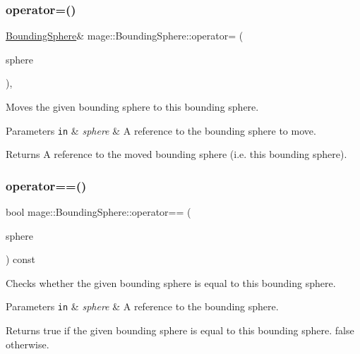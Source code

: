 \subsubsection{\texorpdfstring{operator=()}{operator=()}\hspace{0.1cm}{\footnotesize\ttfamily [2/2]}}
{\footnotesize\ttfamily \hyperlink{classmage_1_1_bounding_sphere}{Bounding\+Sphere}\& mage\+::\+Bounding\+Sphere\+::operator= (\begin{DoxyParamCaption}\item[{\hyperlink{classmage_1_1_bounding_sphere}{Bounding\+Sphere} \&\&}]{sphere }\end{DoxyParamCaption})\hspace{0.3cm}{\ttfamily [default]}, {\ttfamily [noexcept]}}

Moves the given bounding sphere to this bounding sphere.


\begin{DoxyParams}[1]{Parameters}
\mbox{\tt in}  & {\em sphere} & A reference to the bounding sphere to move. \\
\hline
\end{DoxyParams}
\begin{DoxyReturn}{Returns}
A reference to the moved bounding sphere (i.\+e. this bounding sphere). 
\end{DoxyReturn}
\hypertarget{classmage_1_1_bounding_sphere_adc183c59a09a071fbc78b833cc66f218}{}\label{classmage_1_1_bounding_sphere_adc183c59a09a071fbc78b833cc66f218} 
\subsubsection{\texorpdfstring{operator==()}{operator==()}}
{\footnotesize\ttfamily bool mage\+::\+Bounding\+Sphere\+::operator== (\begin{DoxyParamCaption}\item[{const \hyperlink{classmage_1_1_bounding_sphere}{Bounding\+Sphere} \&}]{sphere }\end{DoxyParamCaption}) const\hspace{0.3cm}{\ttfamily [noexcept]}}

Checks whether the given bounding sphere is equal to this bounding sphere.


\begin{DoxyParams}[1]{Parameters}
\mbox{\tt in}  & {\em sphere} & A reference to the bounding sphere. \\
\hline
\end{DoxyParams}
\begin{DoxyReturn}{Returns}
{\ttfamily true} if the given bounding sphere is equal to this bounding sphere. {\ttfamily false} otherwise. 
\end{DoxyReturn}
\hypertarget{classmage_1_1_bounding_sphere_aec1440ef7a88b85ae6a310a41b5b7f20}{}\label{classmage_1_1_bounding_sphere_aec1440ef7a88b85ae6a310a41b5b7f20} 

